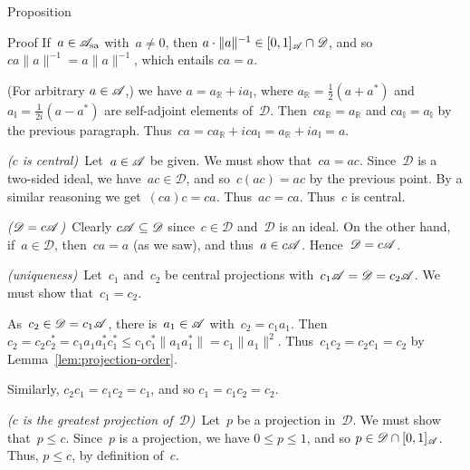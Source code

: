 \documentclass[main]{subfiles}
\begin{document}
\begin{parsec}
\begin{point}{Proposition}
\begin{point}{Proof}
If~$a\in \mathscr{A}_{\mathrm{sa}}$
with~$a\neq 0$,
then $a\cdot\|a\|^{-1} \in [0,1]_{\mathscr{A}}\cap \mathscr{D}$,
and so $ca \|a\|^{-1} = a \|a\|^{-1}$,
which entails $ca = a$.

(For arbitrary $a\in \mathscr{A}$,)
we have $a= a_{\mathbb{R}} + i a_{\mathbb{I}}$,
where $a_\mathbb{R}=\frac{1}{2}(a+a^*)$
and $a_\mathbb{I} = \frac{1}{2i}(a-a^*)$
are self-adjoint elements of~$\mathscr{D}$.
Then~$ca_\mathbb{R}=a_\mathbb{R}$
and $ca_\mathbb{I}=a_\mathbb{I}$
by the previous paragraph.
Thus~$ca=ca_\mathbb{R}+ica_\mathbb{I}=a_\mathbb{R}+ia_\mathbb{I}=a$.

\emph{($c$ is central)}\ 
Let~$a\in\mathscr{A}$ be given.
We must show that~$ca=ac$.
Since~$\mathscr{D}$ is a two-sided ideal,
we have~$ac\in \mathscr{D}$,
and so~$c(ac)=ac$ by the previous point.
By a similar reasoning we get~$(ca)c=ca$.
Thus~$ac=ca$.
Thus~$c$ is central.

\emph{($\mathscr{D} = c\mathscr{A}$)}\ 
Clearly $c\mathscr{A}\subseteq\mathscr{D}$
since~$c\in\mathscr{D}$ and~$\mathscr{D}$ is an ideal.
On the other hand,
if~$a\in\mathscr{D}$,
then~$ca=a$
(as we saw),
and thus~$a\in c\mathscr{A}$.
Hence~$\mathscr{D} = c\mathscr{A}$.

\emph{(uniqueness)}\ 
Let~$c_1$ and~$c_2$ be central projections 
with~$c_1\mathscr{A} = \mathscr{D}=c_2\mathscr{A}$.
We must show that~$c_1=c_2$.

As~$c_2\in\mathscr{D}=c_1 \mathscr{A}$,
there is~$a_1\in \mathscr{A}$
with~$c_2 = c_1a_1$.
Then~$c_2 = c_2c_2^* = c_1a_1a_1^*c_1^*\leq 
c_1c_1^*\|a_1a_1^*\|=c_1\|a_1\|^2$.
Thus~$c_1c_2=c_2c_1=c_2$ by Lemma~\ref{lem:projection-order}.

Similarly, $c_2c_1 = c_1c_2 = c_1$, and so $c_1=c_1c_2=c_2$.

\emph{($c$ is the greatest projection of~$\mathscr{D}$)}\ 
Let~$p$ be a projection in~$\mathscr{D}$.
We must show that~$p\leq c$.
Since~$p$ is a projection,
we have $0\leq p\leq 1$, and so $p\in \mathscr{D}\cap [0,1]_{\mathscr{A}}$.
Thus, $p\leq c$, by definition of~$c$.
\end{point}
\end{point}


\end{parsec}
\end{document}
